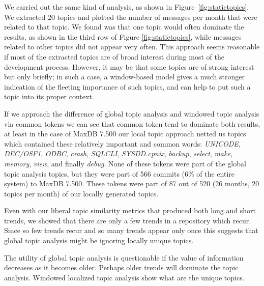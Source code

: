 \documentclass[times, 10pt,twocolumn]{article}
\begin{document}
We carried out the same kind of analysis, as shown in
Figure~\ref{fig:statictopics}. We extracted 20 topics and plotted the
number of messages per month that were related to that topic. We found
was that one topic would often dominate the results, as shown in the
third row of Figure \ref{fig:statictopics}, while messages related to
other topics did not appear very often.
This approach seems reasonable if most of the extracted topics are of
broad interest during most of the development process.  However, it
may be that some topics are of strong interest but only briefly; in
such a case, a window-based model gives a much stronger indication of
the fleeting importance of such topics, and can help to put such a
topic into its proper context.


If we approach the difference of global topic analysis and
windowed topic analysis via common tokens we can see that common token
tend to dominate both results, at least in the case of MaxDB 7.500 our
local topic approach netted us topics which contained these relatively
important and common words: \emph{UNICODE}, \emph{DEC/OSF1},
\emph{ODBC}, \emph{crash}, \emph{SQLCLI}, \emph{SYSDD.cpnix},
\emph{backup}, \emph{select}, \emph{make}, \emph{memory}, \emph{view},
and finally \emph{debug}. None of these tokens were part of the global 
topic analysis topics, but they were part of 566 commits (6\% of the
entire system) to MaxDB 7.500. These tokens were part of 87 out of 520
(26 months, 20 topics per month) of our locally generated topics.


Even with our liberal topic similarity metrics that produced both
long and short trends, we showed that there are only a few trends in a
repository which recur. Since so few trends recur and so many
trends appear only once this suggests that global topic analysis might
be ignoring locally unique topics. 

The utility of global topic analysis is questionable if the value of
information decreases as it becomes older. Perhaps older trends will
dominate the topic analysis. Windowed localized topic analysis show
what are the unique topics.
\end{document}

